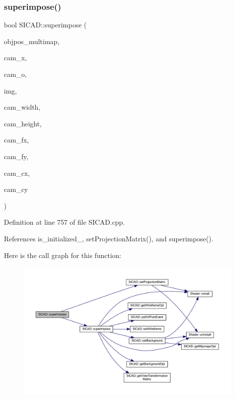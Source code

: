\subsubsection{\texorpdfstring{superimpose()}{superimpose()}\hspace{0.1cm}{\footnotesize\ttfamily [4/4]}}
{\footnotesize\ttfamily bool S\+I\+C\+A\+D\+::superimpose (\begin{DoxyParamCaption}\item[{const std\+::vector$<$ \mbox{\hyperlink{classSuperimpose_a178e3d4e2def6635bfcf9454dd4b5d22}{Model\+Pose\+Container}} $>$ \&}]{objpos\+\_\+multimap,  }\item[{const double $\ast$}]{cam\+\_\+x,  }\item[{const double $\ast$}]{cam\+\_\+o,  }\item[{cv\+::\+Mat \&}]{img,  }\item[{const G\+Lsizei}]{cam\+\_\+width,  }\item[{const G\+Lsizei}]{cam\+\_\+height,  }\item[{const G\+Lfloat}]{cam\+\_\+fx,  }\item[{const G\+Lfloat}]{cam\+\_\+fy,  }\item[{const G\+Lfloat}]{cam\+\_\+cx,  }\item[{const G\+Lfloat}]{cam\+\_\+cy }\end{DoxyParamCaption})\hspace{0.3cm}{\ttfamily [virtual]}}



Definition at line 757 of file S\+I\+C\+A\+D.\+cpp.



References is\+\_\+initialized\+\_\+, set\+Projection\+Matrix(), and superimpose().

Here is the call graph for this function\+:
\nopagebreak
\begin{figure}[H]
\begin{center}
\leavevmode
\includegraphics[width=350pt]{classSICAD_a269e238387393b44177daa4eae88fedd_cgraph}
\end{center}
\end{figure}


